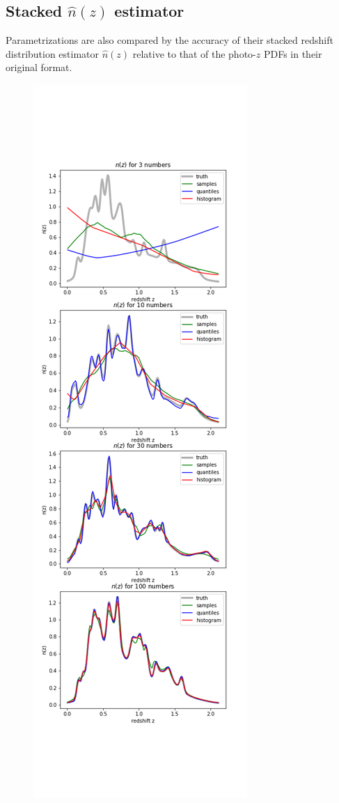 \documentclass[\docopts]{\docclass}
\newcommand{\pz}{photo-$z$ PDF}
\begin{document}

\subsection{Stacked $\hat{n}(z)$ estimator}
\label{sec:stacked}

Parametrizations are also compared by the accuracy of their stacked redshift 
distribution estimator $\hat{n}(z)$ relative to that of the \pz s in their 
original format.

\begin{figure}
  \includegraphics[width=0.9\columnwidth]{figures/stacked_placeholder.png}\\

\end{figure}
\end{document}
